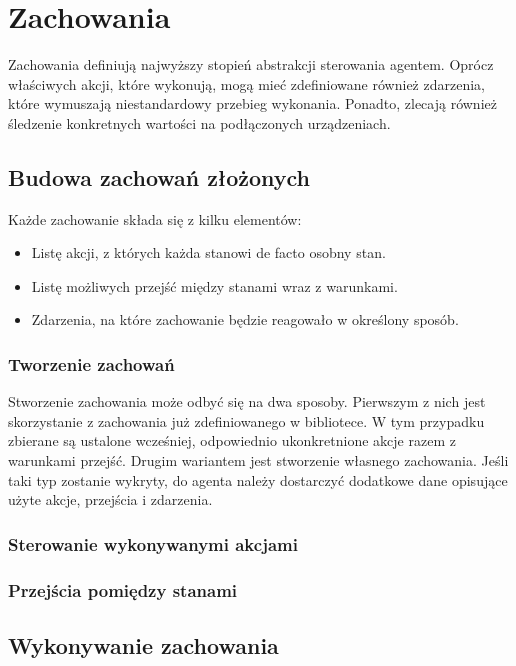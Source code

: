 \chapter{Zachowania}
\label{ch:zachowania}

Zachowania definiują najwyższy stopień abstrakcji sterowania agentem. Oprócz właściwych akcji, które wykonują, mogą mieć zdefiniowane również zdarzenia, które wymuszają niestandardowy przebieg wykonania. Ponadto, zlecają również śledzenie konkretnych wartości na podłączonych urządzeniach.

\section{Budowa zachowań złożonych}

Każde zachowanie składa się z kilku elementów:
\begin{itemize}
    \item Listę akcji, z których każda stanowi de facto osobny stan.
    \item Listę możliwych przejść między stanami wraz z warunkami.
    \item Zdarzenia, na które zachowanie będzie reagowało w określony sposób.
\end{itemize}

\subsection{Tworzenie zachowań}

Stworzenie zachowania może odbyć się na dwa sposoby. Pierwszym z nich jest skorzystanie z zachowania już zdefiniowanego w bibliotece. W tym przypadku zbierane są ustalone wcześniej, odpowiednio ukonkretnione akcje razem z warunkami przejść. Drugim wariantem jest stworzenie własnego zachowania. Jeśli taki typ zostanie wykryty, do agenta należy dostarczyć dodatkowe dane opisujące użyte akcje, przejścia i zdarzenia.


\subsection{Sterowanie wykonywanymi akcjami}

\subsection{Przejścia pomiędzy stanami}


\section{Wykonywanie zachowania}


